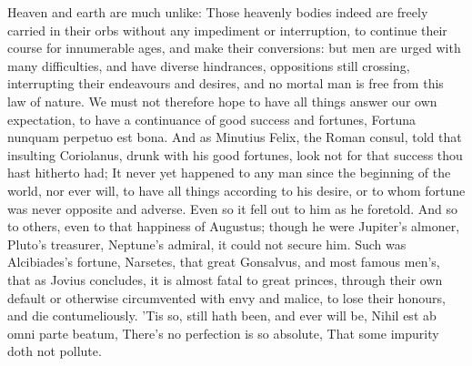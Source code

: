 {Heaven and earth are much unlike: Those heavenly bodies indeed
are freely carried in their orbs without any impediment or
interruption, to continue their course for innumerable ages, and make
their conversions: but men are urged with many difficulties, and have
diverse hindrances, oppositions still crossing, interrupting their
endeavours and desires, and no mortal man is free from this law of
nature. We must not therefore hope to have all things answer our own
expectation, to have a continuance of good success and fortunes,
Fortuna nunquam perpetuo est bona. And as Minutius Felix, the Roman
consul, told that insulting Coriolanus, drunk with his good fortunes,
look not for that success thou hast hitherto had; It never yet
happened to any man since the beginning of the world, nor ever will, to
have all things according to his desire, or to whom fortune was never
opposite and adverse. Even so it fell out to him as he foretold. And so
to others, even to that happiness of Augustus; though he were Jupiter's
almoner, Pluto's treasurer, Neptune's admiral, it could not secure him.
Such was Alcibiades's fortune, Narsetes, that great Gonsalvus, and most
famous men's, that as Jovius concludes, it is almost fatal to
great princes, through their own default or otherwise circumvented with
envy and malice, to lose their honours, and die contumeliously. 'Tis
so, still hath been, and ever will be, Nihil est ab omni parte beatum,
There's no perfection is so absolute,
That some impurity doth not pollute.

}
